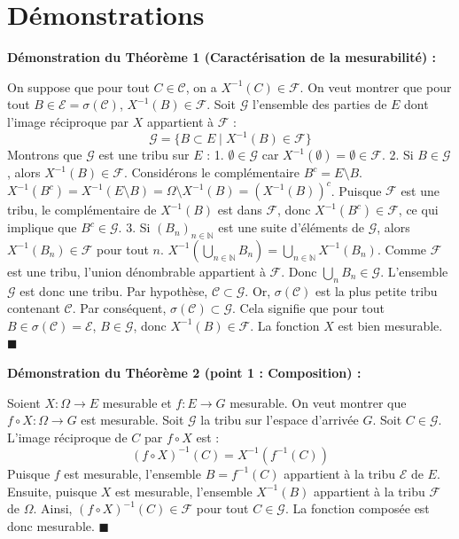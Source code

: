 \documentclass[11pt,a4paper]{article}
\begin{document}
\section{Démonstrations}

\textbf{Démonstration du Théorème 1 (Caractérisation de la mesurabilité) :}

On suppose que pour tout $C \in \mathcal{C}$, on a $X^{-1}(C) \in \mathcal{F}$. On veut montrer que pour tout $B \in \mathcal{E} = \sigma(\mathcal{C})$, $X^{-1}(B) \in \mathcal{F}$.
Soit $\mathcal{G}$ l'ensemble des parties de $E$ dont l'image réciproque par $X$ appartient à $\mathcal{F}$ :
$$ \mathcal{G} = \{ B \subset E \mid X^{-1}(B) \in \mathcal{F} \} $$
Montrons que $\mathcal{G}$ est une tribu sur $E$ :
1. $\emptyset \in \mathcal{G}$ car $X^{-1}(\emptyset) = \emptyset \in \mathcal{F}$.
2. Si $B \in \mathcal{G}$, alors $X^{-1}(B) \in \mathcal{F}$. Considérons le complémentaire $B^c = E \setminus B$.
   $X^{-1}(B^c) = X^{-1}(E \setminus B) = \Omega \setminus X^{-1}(B) = (X^{-1}(B))^c$.
   Puisque $\mathcal{F}$ est une tribu, le complémentaire de $X^{-1}(B)$ est dans $\mathcal{F}$, donc $X^{-1}(B^c) \in \mathcal{F}$, ce qui implique que $B^c \in \mathcal{G}$.
3. Si $(B_n)_{n \in \mathbb{N}}$ est une suite d'éléments de $\mathcal{G}$, alors $X^{-1}(B_n) \in \mathcal{F}$ pour tout $n$.
   $X^{-1}\left(\bigcup_{n \in \mathbb{N}} B_n\right) = \bigcup_{n \in \mathbb{N}} X^{-1}(B_n)$.
   Comme $\mathcal{F}$ est une tribu, l'union dénombrable appartient à $\mathcal{F}$. Donc $\bigcup_{n} B_n \in \mathcal{G}$.
L'ensemble $\mathcal{G}$ est donc une tribu. Par hypothèse, $\mathcal{C} \subset \mathcal{G}$. Or, $\sigma(\mathcal{C})$ est la plus petite tribu contenant $\mathcal{C}$.
Par conséquent, $\sigma(\mathcal{C}) \subset \mathcal{G}$.
Cela signifie que pour tout $B \in \sigma(\mathcal{C}) = \mathcal{E}$, $B \in \mathcal{G}$, donc $X^{-1}(B) \in \mathcal{F}$. La fonction $X$ est bien mesurable. $\blacksquare$

\textbf{Démonstration du Théorème 2 (point 1 : Composition) :}

Soient $X : \Omega \to E$ mesurable et $f : E \to G$ mesurable. On veut montrer que $f \circ X : \Omega \to G$ est mesurable.
Soit $\mathcal{G}$ la tribu sur l'espace d'arrivée $G$. Soit $C \in \mathcal{G}$.
L'image réciproque de $C$ par $f \circ X$ est :
$$ (f \circ X)^{-1}(C) = X^{-1}(f^{-1}(C)) $$
Puisque $f$ est mesurable, l'ensemble $B = f^{-1}(C)$ appartient à la tribu $\mathcal{E}$ de $E$.
Ensuite, puisque $X$ est mesurable, l'ensemble $X^{-1}(B)$ appartient à la tribu $\mathcal{F}$ de $\Omega$.
Ainsi, $(f \circ X)^{-1}(C) \in \mathcal{F}$ pour tout $C \in \mathcal{G}$. La fonction composée est donc mesurable. $\blacksquare$
\end{document}
